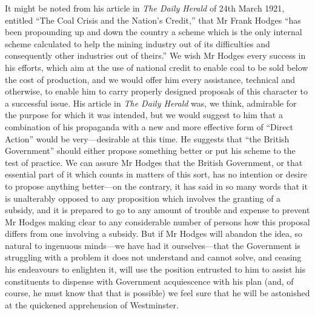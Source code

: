 \documentclass{book}
\begin{document}
It might be noted from his article in \emph{The Daily Herald} of 24th March 1921, entitled “The Coal Crisis and the Nation’s Credit,” that Mr Frank Hodges “has been propounding up and down the country a scheme which is the only internal scheme calculated to help the mining industry out of its difficulties and consequently other industries out of theirs.” We wish Mr Hodges every success in his efforts, which aim at the use of national credit to enable coal to be sold below the cost of production, and we would offer him every assistance, technical and otherwise, to enable him to carry properly designed proposals of this character to a successful issue. His article in \emph{The Daily Herald} was, we think, admirable for the purpose for which it was intended, but we would suggest to him that a combination of his propaganda with a new and more effective form of “Direct Action” would be very—desirable at this time. He suggests that “the British Government” should either propose something better or put his scheme to the test of practice. We can assure Mr Hodges that the British Government, or that essential part of it which counts in matters of this sort, has no intention or desire to propose anything better—on the contrary, it has said in so many words that it is unalterably opposed to any proposition which involves the granting of a subsidy, and it is prepared to go to any amount of trouble and expense to prevent Mr Hodges making clear to any considerable number of persons how this proposal differs from one involving a subsidy. But if Mr Hodges will abandon the idea, so natural to ingenuous minds—we have had it ourselves—that the Government is struggling with a problem it does not understand and cannot solve, and ceasing his endeavours to enlighten it, will use the position entrusted to him to assist his constituents to dispense with Government acquiescence with his plan (and, of course, he must know that that is possible) we feel sure that he will be astonished at the quickened apprehension of Westminster.
\end{document}
